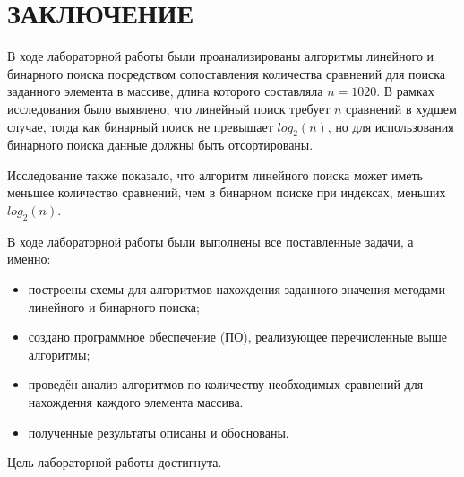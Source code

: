 \chapter*{ЗАКЛЮЧЕНИЕ}

В ходе лабораторной работы были проанализированы алгоритмы линейного и бинарного поиска посредством сопоставления количества сравнений для поиска заданного элемента в массиве, длина которого составляла $n = 1020$. В рамках исследования было выявлено, что линейный поиск требует $n$ сравнений в худшем случае, тогда как бинарный поиск не превышает $log_2(n)$, но для использования бинарного поиска данные должны быть отсортированы.

Исследование также показало, что алгоритм линейного поиска может иметь меньшее количество сравнений, чем в бинарном поиске при индексах, меньших $log_2(n)$.

В ходе лабораторной работы были выполнены все поставленные задачи, а именно:
\begin{itemize}[label=--]
    \item построены схемы для алгоритмов нахождения заданного значения методами линейного и бинарного поиска;
    \item создано программное обеспечение (ПО), реализующее перечисленные выше алгоритмы;
    \item проведён анализ алгоритмов по количеству необходимых сравнений для нахождения каждого элемента массива.
    \item полученные результаты описаны и обоснованы.
\end{itemize}

Цель лабораторной работы достигнута.

